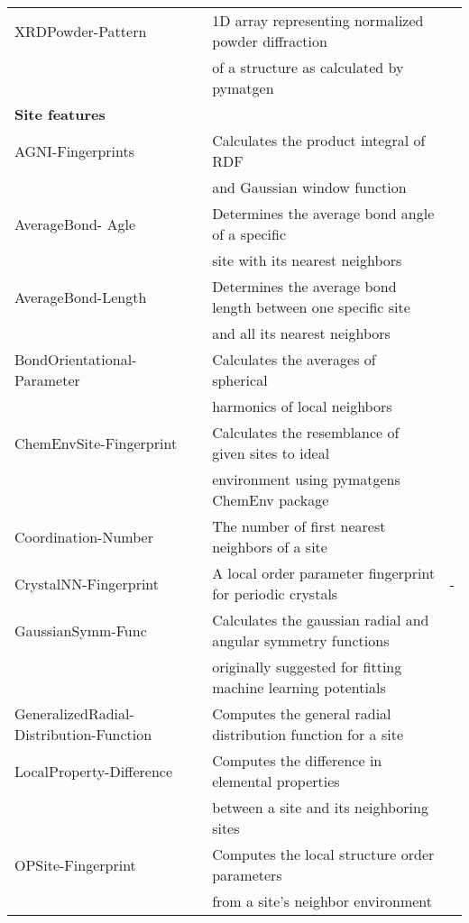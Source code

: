 \begin{center}
\begin{longtable}{M{3.5cm} M{6.5cm} M{2.0cm}}
  XRDPowder-Pattern & 1D array representing normalized powder diffraction & \cite{Ong2013} \\ 
   &of a structure as calculated by pymatgen  & \\ 
    \hline 
  \textbf{Site features} & & \\
  AGNI-Fingerprints & Calculates the product integral of RDF & \cite{Botu2014}  \\    
   & and Gaussian window function  & \\ 
  AverageBond- Agle & Determines the average bond angle of a specific  & \cite{Jong2016}  \\
   & site with its nearest neighbors  & \\ 
  AverageBond-Length & Determines the average bond length between one specific site & \cite{Jong2016}  \\ 
   & and all its nearest neighbors  & \\ 
  BondOrientational-Parameter & Calculates the averages of spherical  & \cite{Seko2017, Steinhardt1983}  \\ 
   & harmonics of local neighbors & \\ 
  ChemEnvSite-Fingerprint & Calculates the resemblance of given sites to ideal & \cite{Waroquiers2017, Zimmermann2017}  \\   
   & environment using pymatgens ChemEnv package  & \\ 
  Coordination-Number & The number of first nearest neighbors of a site & \cite{Zimmermann2017}  \\
  CrystalNN-Fingerprint & A local order parameter fingerprint for periodic crystals & -  \\   
  GaussianSymm-Func & Calculates the gaussian radial and angular symmetry functions  & \cite{Behler2011,Khorshidi2016}  \\   
   & originally suggested for fitting machine learning potentials &  \\ 
  GeneralizedRadial-Distribution-Function & Computes the general radial distribution function for a site & \cite{Seko2017}  \\   
  LocalProperty-Difference & Computes the difference in elemental properties  & \cite{Ward2017, Jong2016} \\   
   & between a site and its neighboring sites & \\ 
  OPSite-Fingerprint & Computes the local structure order parameters & \cite{Zimmermann2017} \\   
   & from a site's neighbor environment  & \\ 

\end{longtable}
\end{center}

